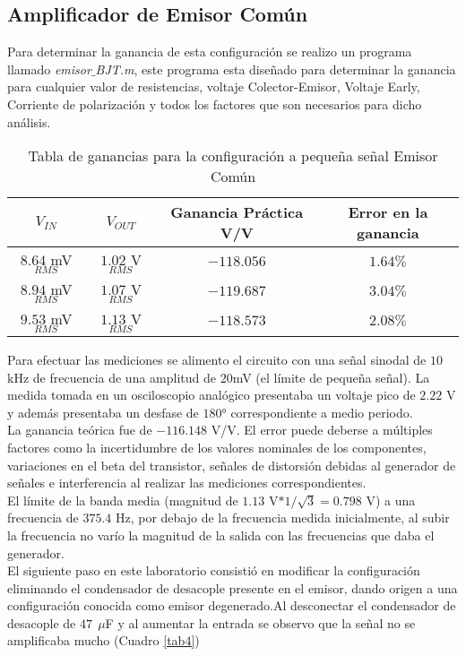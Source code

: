 \documentclass[11pt,graphicx,caption,rotating]{article}
\begin{document}
\subsection{Amplificador de Emisor Común}
\noindent
Para determinar la ganancia de esta configuración se realizo un programa llamado \textit{emisor$\_$BJT.m}, este programa esta diseñado para determinar la ganancia para cualquier valor de resistencias, voltaje Colector-Emisor, Voltaje Early, Corriente de polarización y todos los factores que son necesarios para dicho análisis.
\begin{table}[H]
	\centering
\begin{tabular}[c]{|c|c|c|c|} \hline
$V_{IN}$ & $V_{OUT}$ & \textbf{Ganancia Práctica} V/V & \textbf{Error en la ganancia} \\ \hline
$8.64$ mV$_{RMS}$ & $1.02$ V$_{RMS}$ & $-118.056$ & $1.64\%$ \\ \hline
$8.94$ mV$_{RMS}$ & $1.07$ V$_{RMS}$ & $-119.687$ & $3.04\%$ \\ \hline
$9.53$ mV$_{RMS}$ & $1.13$ V$_{RMS}$ & $-118.573$ & $2.08\%$ \\ \hline
\end{tabular}
	\caption{Tabla de ganancias para la configuración a pequeña señal Emisor Común}
	\label{tab3}
\end{table}
\noindent
Para efectuar las mediciones se alimento el circuito con una señal sinodal de $10$ kHz de frecuencia de una amplitud de $20$mV (el límite de pequeña señal). La medida tomada en un osciloscopio analógico presentaba un voltaje pico de $2.22$ V y además presentaba un desfase de $180°$ correspondiente a medio periodo.\\
La ganancia teórica fue de $-116.148$ V/V. El error puede deberse a múltiples factores como la incertidumbre de los valores nominales de los componentes, variaciones en el beta del transistor, señales de distorsión debidas al generador de señales e interferencia al realizar las mediciones correspondientes.\\
El límite de la banda media (magnitud de $1.13$ V$*1/ \sqrt{3}=0.798$ V)  a una frecuencia de $375.4$ Hz, por debajo de la frecuencia medida inicialmente, al subir la frecuencia no varío la magnitud de la salida con las frecuencias que daba el generador.\\
El siguiente paso en este laboratorio consistió en modificar la configuración eliminando el condensador de desacople presente en el emisor, dando origen a una configuración conocida como emisor degenerado.Al desconectar el condensador de desacople de $47\ \ \mu$F y al aumentar la entrada se observo que la señal no se amplificaba mucho (Cuadro \ref{tab4})
\end{document}
